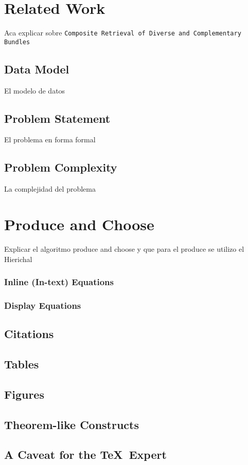 \section{Related Work}
Aca explicar sobre \texttt{Composite Retrieval of Diverse and Complementary Bundles}
\subsection{Data Model}
El modelo de datos
\subsection{Problem Statement}
El problema en forma formal
\subsection{Problem Complexity}
La complejidad del problema
\section{Produce and Choose}
Explicar el algoritmo produce and choose y que para el produce se utilizo el Hierichal
\subsubsection{Inline (In-text) Equations}
\subsubsection{Display Equations}
\subsection{Citations}
\subsection{Tables}
\subsection{Figures}
\subsection{Theorem-like Constructs}
\subsection*{A {\secit Caveat} for the \TeX\ Expert}
